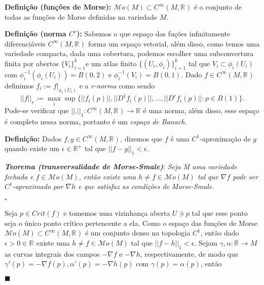 \documentclass[12pt]{book}
\newcommand{\real}[1]{\mathbb{R}^{#1}}
\newcommand{\definicao}[1]{\vspace{2mm} \textbf{Definição:}{ #1}}
\newcommand{\definicaonomeada}[2]{\vspace{2mm} \textbf{Definição (#1):}{ #2}}
\newcommand{\tese}[3]{\vspace{2mm} \textit{\textbf{#1}}: \textit{#2} \par $\square$ #3 \par $\blacksquare$}
\newcommand{\morsefunc}[1]{\mathcal{M}o(#1)}
\newcommand{\pontocritico}[1]{\textit{Crit}(#1)}
\newcommand{\suavefunc}[1]{C^{\infty}(#1, \real{})}
\begin{document}
	\definicaonomeada{funções de Morse}{$\morsefunc{M} \subset \suavefunc{M}$ é o conjunto de todas as funções de Morse definidas na variedade $M$.}
	
	\definicaonomeada{norma $C^{r}$}{Sabemos o que espaço das fuções infinitamente diferenciáveis $\suavefunc{M}$ forma um espaço vetorial, além disso, como temos uma variedade compacta, dada uma cobertura, podemos escolher uma subconvertura finita por abertos $\{V_{i}\}_{i=1}^{k}$e um atlas finito $\{(U_{i}, \phi_{i})\}_{i=1}^{k}$ tal que $V_{i} \subset \phi_{i}(U_{i})$ com $\phi_{i}^{-1}(\phi_{i}(U_{i})) = B(0,2)$ e $\phi_{i}^{-1}(V_{i}) = B(0,1)$. Dado $f \in \suavefunc{M}$ definimos $f_{i} := f|_{\phi_{i}(U_{i})}$ e a \textit{r-norma} como sendo 
	$$
	||f||_{r} := \max_{i} \sup\{||f_{i}(p)||, ||D^{1}f_{i}(p)||, \dots, ||D^{r}f_{i}(p)||: p \in B(1)\}.
	$$
	Pode-se verificar que $||.||_{1}: \suavefunc{M} \to \real{}$ é uma norma, além disso, esse espaço é completo nessa norma, portanto é um \textit{espaço de Banach}.}

	\definicao{Dados $f, g \in \suavefunc{M}$, dizemos que $f$ é uma $C^{1}$-aproximação de $g$ quando existe um $\epsilon \in \real{+}$ tal que $||f-g||_{1} < \epsilon$.}
	
	\tese{Teorema (transversalidade de Morse-Smale)}{Seja M uma variedade fechada e $f \in \morsefunc{M}$, então existe uma $h \neq f \in \morsefunc{M}$ tal que $\nabla f$ pode ser $C^{1}$-aproximado por $\nabla h$ e que satisfaz as condições de Morse-Smale.}{
		
	Seja $p \in \pontocritico{f}$ e tomemos uma vizinhança aberta $U \ni p$ tal que esse ponto seja o único ponto crítico pertencente a ela. Como o espaço das funções de Morse $\morsefunc{M} \subset C^{\infty}(M, \real{})$ é um conjunto denso na topologia $C^{1}$, então dado $\epsilon > 0 \in \real{}$ existe uma $h \neq f \in \morsefunc{M}$ tal que $||f-h||_{1} < \epsilon$. Sejam $\gamma, \alpha : \real{} \to M$ as curvas integrais dos campos $-\nabla f$ e $-\nabla h$, respectivamente, de modo que $\gamma'(p) = -\nabla f(p), \alpha'(p) = -\nabla h(p)$ com $\gamma(p) = \alpha(p)$, então }
\end{document}
